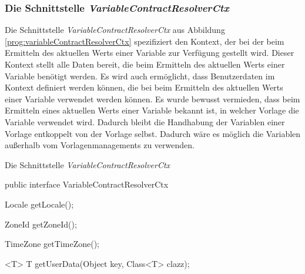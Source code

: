 \subsubsection{Die Schnittstelle \emph{VariableContractResolverCtx}}
\label{sec:variableResolverFactoryProvider}
Die Schnittstelle \emph{VariableContractResolverCtx} aus Abbildung \ref{prog:variableContractResolverCtx} spezifiziert den Kontext, der bei der beim Ermitteln des aktuellen Werts einer Variable zur Verfügung gestellt wird. Dieser Kontext stellt alle Daten bereit, die beim Ermitteln des aktuellen Werts einer Variable benötigt werden. Es wird auch ermöglicht, dass Benutzerdaten im Kontext definiert werden können, die bei beim Ermitteln des aktuellen Werts einer Variable verwendet werden können. Es wurde bewusst vermieden, dass beim Ermitteln eines aktuellen Werts einer Variable bekannt ist, in welcher Vorlage die Variable verwendet wird. Dadurch bleibt die Handhabung der Variablen einer Vorlage entkoppelt von der Vorlage selbst. Dadurch wäre es möglich die Variablen außerhalb vom Vorlagenmanagements zu verwenden.
\newpage

\begin{program}[h]
\caption{Die Schnittstelle \emph{VariableContractResolverCtx}}
\label{prog:variableContractResolverCtx}
\begin{JavaCode}
public interface VariableContractResolverCtx {

    Locale getLocale();

    ZoneId getZoneId();

    TimeZone getTimeZone();

    <T> T getUserData(Object key,
                      Class<T> clazz);
}
\end{JavaCode}
\end{program}

